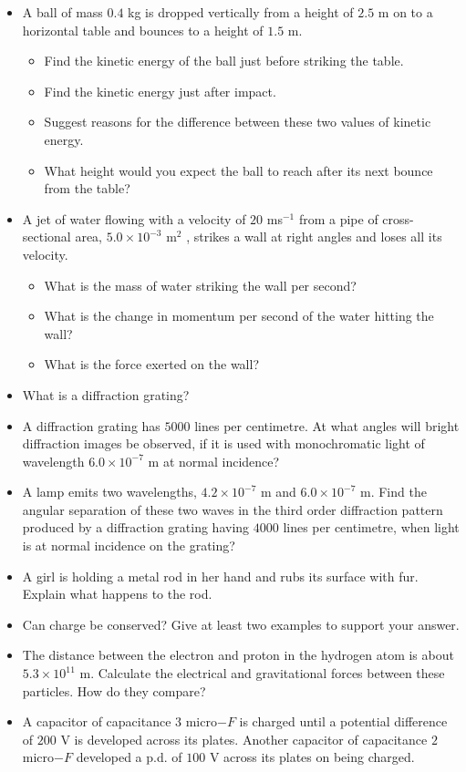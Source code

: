 \documentclass{article}
\begin{document}
\begin{itemize}
\item A ball of mass $ 0.4$ kg is dropped vertically from a height of $ 2.5$ m on to a horizontal table and bounces to a height of $ 1.5$ m.
 \begin{itemize}
\item Find the kinetic energy of the ball just before striking the table.
\item Find the kinetic energy just after impact.
\item Suggest reasons for the difference between these two values of kinetic energy.
\item What height would you expect the ball to reach after its next bounce from the table?
\end{itemize}
\item A jet of water flowing with a velocity of $ 20$ ms$ ^{-1}$ from a pipe of cross-sectional area, $ 5.0 \times 10^{-3}$ m$ ^{2}$ , strikes a wall at right angles and loses all its velocity.
 \begin{itemize}
\item What is the mass of water striking the wall per second?
\item What is the change in momentum per second of the water hitting the wall?
\item What is the force exerted on the wall?
\end{itemize}
\item What is a diffraction grating?
\item A diffraction grating has $ 5000$ lines per centimetre. At what angles will bright diffraction images be observed, if it is used with monochromatic light of wavelength $ 6.0 \times 10^{-7}$ m at normal incidence?
\item A lamp emits two wavelengths, $ 4.2 \times 10^{-7}$ m and $ 6.0 \times 10^{-7}$ m. Find the angular separation of these two waves in the third order diffraction pattern produced by a diffraction grating having $ 4000$ lines per centimetre, when light is at normal incidence on the grating?
\item A girl is holding a metal rod in her hand and rubs its surface with fur. Explain what happens to the rod.
\item Can charge be conserved? Give at least two examples to support your answer.
\item The distance between the electron and proton in the hydrogen atom is about $ 5.3 \times 10^{11}$ m. Calculate the electrical and gravitational forces between these particles. How do they compare?
\item A capacitor of capacitance $ 3$ micro$ -F$ is charged until a potential difference of $ 200$ V is developed across its plates. Another capacitor of capacitance $ 2$ micro$ -F$ developed a p.d. of $ 100$ V across its plates on being charged.

\end{itemize}
\end{document}

